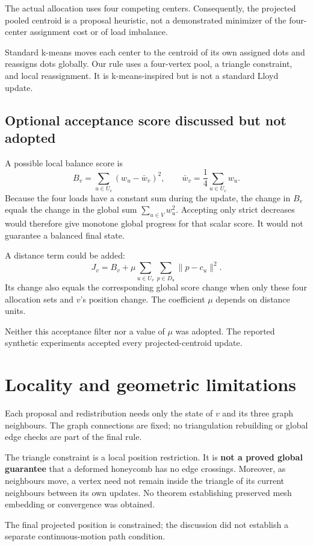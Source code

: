 \documentclass[11pt]{article}
\begin{document}
The actual allocation uses four competing centers. Consequently, the projected pooled centroid is a proposal heuristic, not a demonstrated minimizer of the four-center assignment cost or of load imbalance.

Standard k-means moves each center to the centroid of its own assigned dots and reassigns dots globally. Our rule uses a four-vertex pool, a triangle constraint, and local reassignment. It is k-means-inspired but is not a standard Lloyd update.

\subsection{Optional acceptance score discussed but not adopted}
A possible local balance score is
\[
B_v=\sum_{u\in U_v}(w_u-\bar w_v)^2,
\qquad
\bar w_v=\frac{1}{4}\sum_{u\in U_v}w_u.
\]
Because the four loads have a constant sum during the update, the change in $B_v$ equals the change in the global sum $\sum_{u\in V}w_u^2$. Accepting only strict decreases would therefore give monotone global progress for that scalar score. It would not guarantee a balanced final state.

A distance term could be added:
\[
J_v=B_v+\mu\sum_{u\in U_v}\sum_{p\in D_u}\|p-c_u\|^2.
\]
Its change also equals the corresponding global score change when only these four allocation sets and $v$'s position change. The coefficient $\mu$ depends on distance units.

Neither this acceptance filter nor a value of $\mu$ was adopted. The reported synthetic experiments accepted every projected-centroid update.

\section{Locality and geometric limitations}
Each proposal and redistribution needs only the state of $v$ and its three graph neighbours. The graph connections are fixed; no triangulation rebuilding or global edge checks are part of the final rule.

The triangle constraint is a local position restriction. It is \textbf{not a proved global guarantee} that a deformed honeycomb has no edge crossings. Moreover, as neighbours move, a vertex need not remain inside the triangle of its current neighbours between its own updates. No theorem establishing preserved mesh embedding or convergence was obtained.

The final projected position is constrained; the discussion did not establish a separate continuous-motion path condition.
\end{document}
